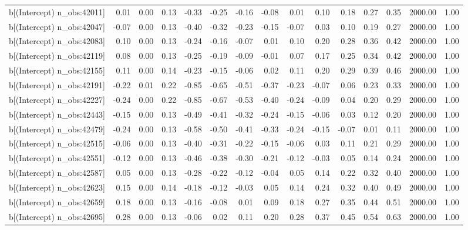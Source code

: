 \begin{table}[ht]
\begin{tabular}{rrrrrrrrrrrrrrr}
  b[(Intercept) n\_obs:42011] & 0.01 & 0.00 & 0.13 & -0.33 & -0.25 & -0.16 & -0.08 & 0.01 & 0.10 & 0.18 & 0.27 & 0.35 & 2000.00 & 1.00 \\ 
  b[(Intercept) n\_obs:42047] & -0.07 & 0.00 & 0.13 & -0.40 & -0.32 & -0.23 & -0.15 & -0.07 & 0.03 & 0.10 & 0.19 & 0.27 & 2000.00 & 1.00 \\ 
  b[(Intercept) n\_obs:42083] & 0.10 & 0.00 & 0.13 & -0.24 & -0.16 & -0.07 & 0.01 & 0.10 & 0.20 & 0.28 & 0.36 & 0.42 & 2000.00 & 1.00 \\ 
  b[(Intercept) n\_obs:42119] & 0.08 & 0.00 & 0.13 & -0.25 & -0.19 & -0.09 & -0.01 & 0.07 & 0.17 & 0.25 & 0.34 & 0.42 & 2000.00 & 1.00 \\ 
  b[(Intercept) n\_obs:42155] & 0.11 & 0.00 & 0.14 & -0.23 & -0.15 & -0.06 & 0.02 & 0.11 & 0.20 & 0.29 & 0.39 & 0.46 & 2000.00 & 1.00 \\ 
  b[(Intercept) n\_obs:42191] & -0.22 & 0.01 & 0.22 & -0.85 & -0.65 & -0.51 & -0.37 & -0.23 & -0.07 & 0.06 & 0.23 & 0.33 & 2000.00 & 1.00 \\ 
  b[(Intercept) n\_obs:42227] & -0.24 & 0.00 & 0.22 & -0.85 & -0.67 & -0.53 & -0.40 & -0.24 & -0.09 & 0.04 & 0.20 & 0.29 & 2000.00 & 1.00 \\ 
  b[(Intercept) n\_obs:42443] & -0.15 & 0.00 & 0.13 & -0.49 & -0.41 & -0.32 & -0.24 & -0.15 & -0.06 & 0.03 & 0.12 & 0.20 & 2000.00 & 1.00 \\ 
  b[(Intercept) n\_obs:42479] & -0.24 & 0.00 & 0.13 & -0.58 & -0.50 & -0.41 & -0.33 & -0.24 & -0.15 & -0.07 & 0.01 & 0.11 & 2000.00 & 1.00 \\ 
  b[(Intercept) n\_obs:42515] & -0.06 & 0.00 & 0.13 & -0.40 & -0.31 & -0.22 & -0.15 & -0.06 & 0.03 & 0.11 & 0.21 & 0.29 & 2000.00 & 1.00 \\ 
  b[(Intercept) n\_obs:42551] & -0.12 & 0.00 & 0.13 & -0.46 & -0.38 & -0.30 & -0.21 & -0.12 & -0.03 & 0.05 & 0.14 & 0.24 & 2000.00 & 1.00 \\ 
  b[(Intercept) n\_obs:42587] & 0.05 & 0.00 & 0.13 & -0.28 & -0.22 & -0.12 & -0.04 & 0.05 & 0.14 & 0.22 & 0.32 & 0.40 & 2000.00 & 1.00 \\ 
  b[(Intercept) n\_obs:42623] & 0.15 & 0.00 & 0.14 & -0.18 & -0.12 & -0.03 & 0.05 & 0.14 & 0.24 & 0.32 & 0.40 & 0.49 & 2000.00 & 1.00 \\ 
  b[(Intercept) n\_obs:42659] & 0.18 & 0.00 & 0.13 & -0.16 & -0.08 & 0.01 & 0.09 & 0.18 & 0.27 & 0.35 & 0.44 & 0.51 & 2000.00 & 1.00 \\ 
  b[(Intercept) n\_obs:42695] & 0.28 & 0.00 & 0.13 & -0.06 & 0.02 & 0.11 & 0.20 & 0.28 & 0.37 & 0.45 & 0.54 & 0.63 & 2000.00 & 1.00 \\ 

\end{tabular}
\end{table}
